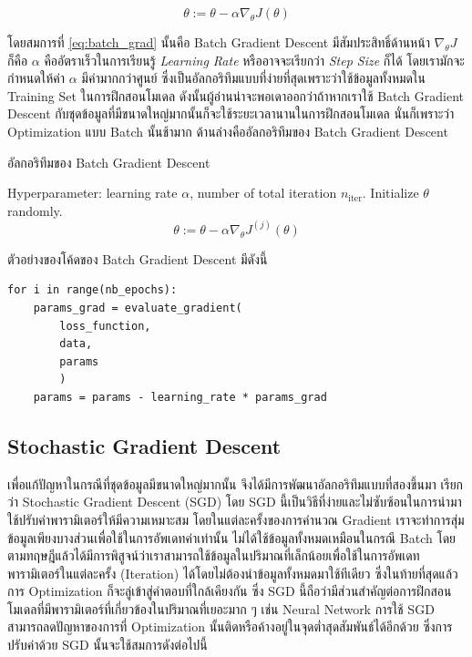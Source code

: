 \begin{equation}\label{eq:batch_grad}
    \theta := \theta - \alpha\nabla_\theta J(\theta)
\end{equation}

\noindent โดยสมการที่ \eqref{eq:batch_grad} นั้นคือ Batch Gradient Descent มีสัมประสิทธิ์ด้านหน้า $\nabla_\theta J$ ก็คือ
$\alpha$ คืออัตราเร็วในการเรียนรู้ \textit{Learning Rate} หรืออาจจะเรียกว่า \textit{Step Size} ก็ได้ โดยเรามักจะกำหนดให้ค่า
$\alpha$ มีค่ามากกว่าศูนย์ ซึ่งเป็นอัลกอริทึมแบบที่ง่ายที่สุดเพราะว่าใช้ข้อมูลทั้งหมดใน Training Set ในการฝึกสอนโมเดล ดังนั้นผู้อ่านน่าจะพอเดาออกว่าถ้าหากเราใช้ Batch Gradient Descent กับชุดข้อมูลที่มีขนาดใหญ่มากนั้นก็จะใช้ระยะเวลานานในการฝึกสอนโมเดล นั่นก็เพราะว่า
Optimization แบบ Batch นั้นช้ามาก ด้านล่างคืออัลกอริทึมของ Batch Gradient Descent

\begin{algorithm}[H]
    \caption{อัลกอริทึมของ Batch Gradient Descent}
    \label{alg:batch_grad}
    \begin{algorithmic}
        \State Hyperparameter: learning rate $\alpha$, number of total iteration $n_\text{iter}$.
        \State Initialize $\theta$ randomly.
        \begin{equation*}
            \theta := \theta - \alpha\nabla_\theta J^{(j)}(\theta)
        \end{equation*}
        \EndFor
    \end{algorithmic}
\end{algorithm}

\noindent ตัวอย่างของโค้ดของ Batch Gradient Descent มีดังนี้

\begin{lstlisting}[style=MyPython]
for i in range(nb_epochs):
    params_grad = evaluate_gradient(
        loss_function, 
        data, 
        params
        )
    params = params - learning_rate * params_grad
\end{lstlisting}

\subsection{Stochastic Gradient Descent}
\label{ssec:stochastic_grad}

เพื่อแก้ปัญหาในกรณีที่ชุดข้อมูลมีขนาดใหญ่มากนั้น จึงได้มีการพัฒนาอัลกอริทึมแบบที่สองขึ้นมา เรียกว่า Stochastic Gradient Descent (SGD)
โดย SGD นี้เป็นวิธีที่ง่ายและไม่ซับซ้อนในการนำมาใช้ปรับค่าพารามิเตอร์ให้มีความเหมาะสม โดยในแต่ละครั้งของการคำนวณ Gradient เราจะทำการสุ่มข้อมูลเพียงบางส่วนเพื่อใช้ในการอัพเดทค่าเท่านั้น ไม่ได้ใช้ข้อมูลทั้งหมดเหมือนในกรณี Batch โดยตามทฤษฎีแล้วได้มีการพิสูจน์ว่าเราสามารถใช้ข้อมูลในปริมาณที่เล็กน้อยเพื่อใช้ในการอัพเดทพารามิเตอร์ในแต่ละครั้ง (Iteration) ได้โดยไม่ต้องนำข้อมูลทั้งหมดมาใช้ทีเดียว ซึ่งในท้ายที่สุดแล้วการ Optimization ก็จะลู่เข้าสู่คำตอบที่ใกล้เคียงกัน ซึ่ง SGD นี้ถือว่ามีส่วนสำคัญต่อการฝึกสอนโมเดลที่มีพารามิเตอร์ที่เกี่ยวข้องในปริมาณที่เยอะมาก ๆ เช่น Neural Network การใช้ SGD สามารถลดปัญหาของการที่ Optimization นั้นติดหรือค้างอยู่ในจุดต่ำสุดสัมพันธ์ได้อีกด้วย ซึ่งการปรับค่าด้วย SGD นั้นจะใช้สมการดังต่อไปนี้

